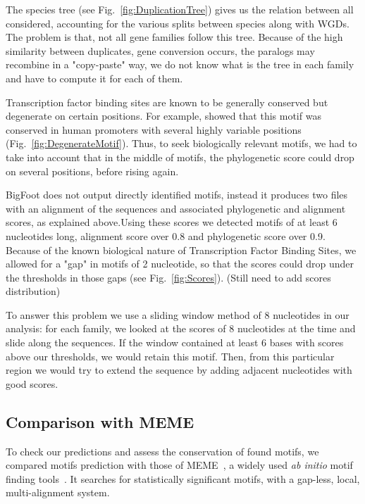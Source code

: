 The species tree (see Fig.~\ref{fig:DuplicationTree}) gives us the relation between all considered, accounting for the various splits between species along with WGDs. The problem is that, not all gene families follow this tree. Because of the high similarity between duplicates, gene conversion occurs, the paralogs may recombine in a "copy-paste" way, we do not know what is the tree in each family and have to compute it for each of them.

Transcription factor binding sites are known to be generally conserved but degenerate on certain positions. For example, \citealt{whitfield_functional_2012} showed that this motif was conserved in human promoters with several highly variable positions (Fig.~\ref{fig:DegenerateMotif}). Thus, to seek biologically relevant motifs, we had to take into account that in the middle of motifs, the phylogenetic score could drop on several positions, before rising again.

BigFoot does not output directly identified motifs, instead it produces two files with an alignment of the sequences and associated phylogenetic and alignment scores, as explained above.Using these scores we detected motifs of at least 6 nucleotides long, alignment score over 0.8 and phylogenetic score over 0.9. Because of the known biological nature of Transcription Factor Binding Sites, we allowed for a "gap" in motifs of 2 nucleotide, so that the scores could drop under the thresholds in those gaps (see Fig.~\ref{fig:Scores}). (Still need to add scores distribution)

To answer this problem we use a sliding window method of 8 nucleotides in our analysis: for each family, we looked at the scores of 8 nucleotides at the time and slide along the sequences. If the window contained at least 6 bases with scores above our thresholds, we would retain this motif. Then, from this particular region we would try to extend the sequence by adding adjacent nucleotides with good scores.

\subsection*{Comparison with MEME}

To check our predictions and assess the conservation of found motifs, we compared motifs prediction with those of MEME~\citep{bailey_meme:_2006}, a widely used \textit{ab initio} motif finding tools~\citep{dhaeseleer_how_2006}. It searches for statistically significant motifs, with a gap-less, local, multi-alignment system.

